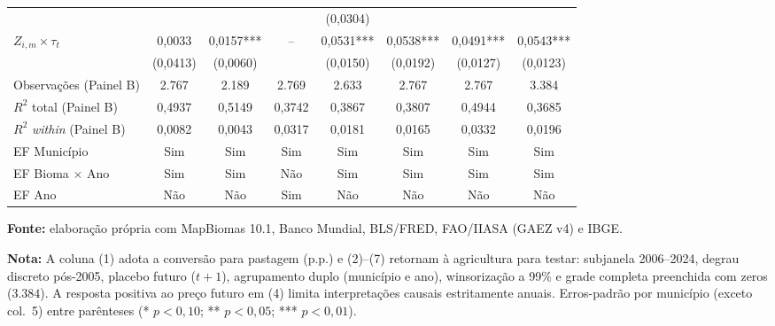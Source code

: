 \begin{table}[htbp]
\begin{tabular}{lccccccc}
 &  &  &  & (0,0304) &  &  &  \\
$Z_{i,m} \times \tau_t$ & 0,0033 & 0,0157*** & -- & 0,0531*** & 0,0538*** & 0,0491*** & 0,0543*** \\
 & (0,0413) & (0,0060) &  & (0,0150) & (0,0192) & (0,0127) & (0,0123) \\
\midrule
Observações (Painel B) & 2.767 & 2.189 & 2.769 & 2.633 & 2.767 & 2.767 & 3.384 \\
$R^2$ total (Painel B) & 0,4937 & 0,5149 & 0,3742 & 0,3867 & 0,3807 & 0,4944 & 0,3685 \\
$R^2$ \textit{within} (Painel B) & 0,0082 & 0,0043 & 0,0317 & 0,0181 & 0,0165 & 0,0332 & 0,0196 \\
EF Município & Sim & Sim & Sim & Sim & Sim & Sim & Sim \\
EF Bioma $\times$ Ano & Sim & Sim & Não & Sim & Sim & Sim & Sim \\
EF Ano & Não & Não & Sim & Não & Não & Não & Não \\
\bottomrule
\end{tabular}
\par\smallskip\begin{minipage}{\textwidth}\footnotesize
\SingleSpacing
\noindent\textbf{Fonte:} elaboração própria com MapBiomas 10.1, Banco Mundial, BLS/FRED, FAO/IIASA (GAEZ v4) e IBGE.\par\medskip
\noindent\textbf{Nota:} A coluna (1) adota a conversão para pastagem (p.p.) e (2)--(7) retornam à agricultura para testar: subjanela 2006--2024, degrau discreto pós-2005, placebo futuro ($t+1$), agrupamento duplo (município e ano), winsorização a 99\% e grade completa preenchida com zeros ($3.384$). A resposta positiva ao preço futuro em (4) limita interpretações causais estritamente anuais. Erros-padrão por município (exceto col.~5) entre parênteses (* $p<0{,}10$; ** $p<0{,}05$; *** $p<0{,}01$).
\end{minipage}
\end{table}
